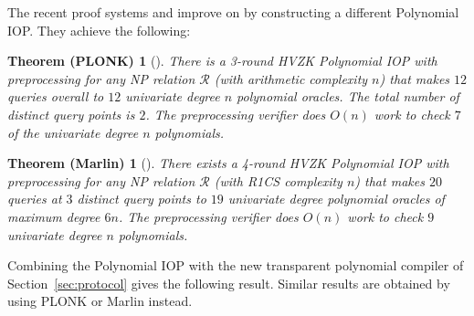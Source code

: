 The recent proof systems  and  improve on  by constructing a different Polynomial IOP. They achieve the following: 

\newtheorem*{plonktheorem}{Theorem (PLONK)}

\begin{plonktheorem}[\cite{Plonk}] 
There is a 3-round HVZK Polynomial IOP with preprocessing for any NP relation $\mathcal{R}$ (with arithmetic complexity $n$) that makes $12$ queries overall to $12$ univariate degree $n$ polynomial oracles. The total number of distinct query points is $2$. The preprocessing verifier does $O(n)$ work to check $7$ of the univariate degree $n$ polynomials.
\end{plonktheorem}
\newtheorem*{marlintheorem}{Theorem (Marlin)}

\begin{marlintheorem}[\cite{Marlin}] 
There exists a 4-round HVZK Polynomial IOP with preprocessing for any NP relation $\mathcal{R}$ (with R1CS complexity $n$) that makes $20$ queries at $3$ distinct query points to $19$ univariate degree polynomial oracles of maximum degree  $6n$. The preprocessing verifier does $O(n)$ work to check $9$ univariate degree $n$ polynomials.
\end{marlintheorem}

Combining the  Polynomial IOP with the new transparent polynomial compiler of Section~\ref{sec:protocol} gives the following result.  Similar results are obtained by using \textsf{PLONK} or \textsf{Marlin} instead.  

